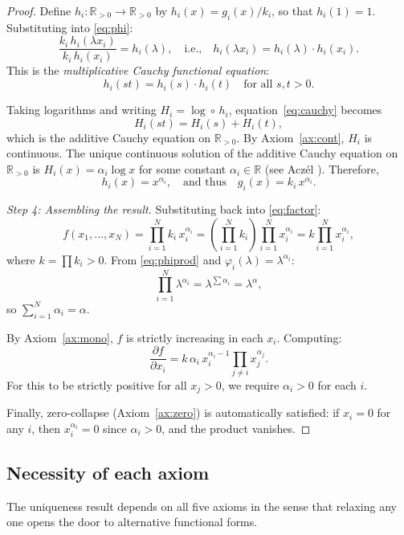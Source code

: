 \documentclass[12pt, a4paper]{article}
\theoremstyle{definition}
\theoremstyle{remark}
\newcommand{\R}{\mathbb{R}}
\newcommand{\Rp}{\mathbb{R}_{>0}}
\begin{document}
\begin{proof}
Define $h_i : \Rp \to \Rp$ by $h_i(x) = g_i(x)/k_i$, so that $h_i(1) = 1$. Substituting into \eqref{eq:phi}:
\[
\frac{k_i \, h_i(\lambda x_i)}{k_i \, h_i(x_i)} = h_i(\lambda), \quad \text{i.e.,} \quad h_i(\lambda x_i) = h_i(\lambda) \cdot h_i(x_i).
\]
This is the \textit{multiplicative Cauchy functional equation}:
\begin{equation}\label{eq:cauchy}
h_i(st) = h_i(s) \cdot h_i(t) \quad \text{for all } s, t > 0.
\end{equation}

Taking logarithms and writing $H_i = \log \circ \, h_i$, equation~\eqref{eq:cauchy} becomes
\[
H_i(st) = H_i(s) + H_i(t),
\]
which is the additive Cauchy equation on $\Rp$. By Axiom~\ref{ax:cont}, $H_i$ is continuous. The unique continuous solution of the additive Cauchy equation on $\Rp$ is $H_i(x) = \alpha_i \log x$ for some constant $\alpha_i \in \R$ (see Acz\'el \cite[Theorem~1, p.~34]{aczel1966}). Therefore,
\[
h_i(x) = x^{\alpha_i}, \quad \text{and thus} \quad g_i(x) = k_i \, x^{\alpha_i}.
\]

\medskip
\noindent\textit{Step 4: Assembling the result.} Substituting back into \eqref{eq:factor}:
\[
f(x_1, \ldots, x_N) = \prod_{i=1}^{N} k_i \, x_i^{\alpha_i} = \left(\prod_{i=1}^{N} k_i\right) \prod_{i=1}^{N} x_i^{\alpha_i} = k \prod_{i=1}^{N} x_i^{\alpha_i},
\]
where $k = \prod k_i > 0$. From \eqref{eq:phiprod} and $\varphi_i(\lambda) = \lambda^{\alpha_i}$:
\[
\prod_{i=1}^{N} \lambda^{\alpha_i} = \lambda^{\sum \alpha_i} = \lambda^\alpha,
\]
so $\sum_{i=1}^{N} \alpha_i = \alpha$.

By Axiom~\ref{ax:mono}, $f$ is strictly increasing in each $x_i$. Computing:
\[
\frac{\partial f}{\partial x_i} = k \, \alpha_i \, x_i^{\alpha_i - 1} \prod_{j \neq i} x_j^{\alpha_j}.
\]
For this to be strictly positive for all $x_j > 0$, we require $\alpha_i > 0$ for each $i$.

Finally, zero-collapse (Axiom~\ref{ax:zero}) is automatically satisfied: if $x_i = 0$ for any $i$, then $x_i^{\alpha_i} = 0$ since $\alpha_i > 0$, and the product vanishes.
\end{proof}

\subsection{Necessity of each axiom}

The uniqueness result depends on all five axioms in the sense that relaxing any one opens the door to alternative functional forms.
\end{document}
